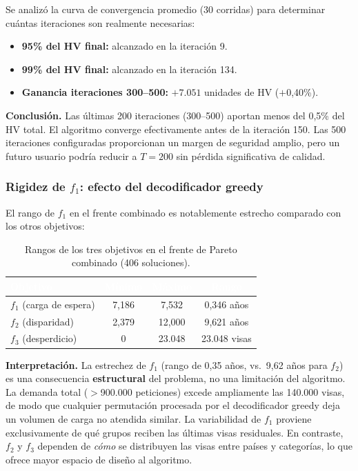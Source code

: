 \documentclass[12pt,letterpaper]{article}
\begin{document}
Se analizó la curva de convergencia promedio (30 corridas) para determinar cuántas iteraciones son realmente necesarias:

\begin{itemize}
    \item \textbf{95\% del HV final:} alcanzado en la iteración 9.
    \item \textbf{99\% del HV final:} alcanzado en la iteración 134.
    \item \textbf{Ganancia iteraciones 300--500:} $+7.051$ unidades de HV ($+$0{,}40\%).
\end{itemize}

\begin{yellowbox}
\textbf{Conclusión.} Las últimas 200 iteraciones (300--500) aportan menos del 0{,}5\% del HV total. El algoritmo converge efectivamente antes de la iteración 150. Las 500 iteraciones configuradas proporcionan un margen de seguridad amplio, pero un futuro usuario podría reducir a $T = 200$ sin pérdida significativa de calidad.
\end{yellowbox}

\subsubsection{Rigidez de $f_1$: efecto del decodificador greedy}

El rango de $f_1$ en el frente combinado es notablemente estrecho comparado con los otros objetivos:

\begin{table}[H]
\centering
\caption{Rangos de los tres objetivos en el frente de Pareto combinado (406 soluciones).}
\label{tab:obj_ranges}
\renewcommand{\arraystretch}{1.4}
\begin{tabular}{lccc}
\toprule
\rowcolor{tablehead}
\textcolor{white}{\textbf{Objetivo}} & \textcolor{white}{\textbf{Mínimo}} & \textcolor{white}{\textbf{Máximo}} & \textcolor{white}{\textbf{Rango}} \\
\midrule
$f_1$ (carga de espera) & 7,186 & 7,532 & 0,346 años \\
\rowcolor{gray!8}
$f_2$ (disparidad) & 2,379 & 12,000 & 9,621 años \\
$f_3$ (desperdicio) & 0 & 23.048 & 23.048 visas \\
\bottomrule
\end{tabular}
\end{table}

\begin{answerbox}
\textbf{Interpretación.} La estrechez de $f_1$ (rango de 0{,}35 años, vs.\ 9{,}62 años para $f_2$) es una consecuencia \textbf{estructural} del problema, no una limitación del algoritmo. La demanda total ($>$900.000 peticiones) excede ampliamente las 140.000 visas, de modo que cualquier permutación procesada por el decodificador greedy deja un volumen de carga no atendida similar. La variabilidad de $f_1$ proviene exclusivamente de qué grupos reciben las últimas visas residuales. En contraste, $f_2$ y $f_3$ dependen de \textit{cómo} se distribuyen las visas entre países y categorías, lo que ofrece mayor espacio de diseño al algoritmo.
\end{answerbox}
\end{document}
